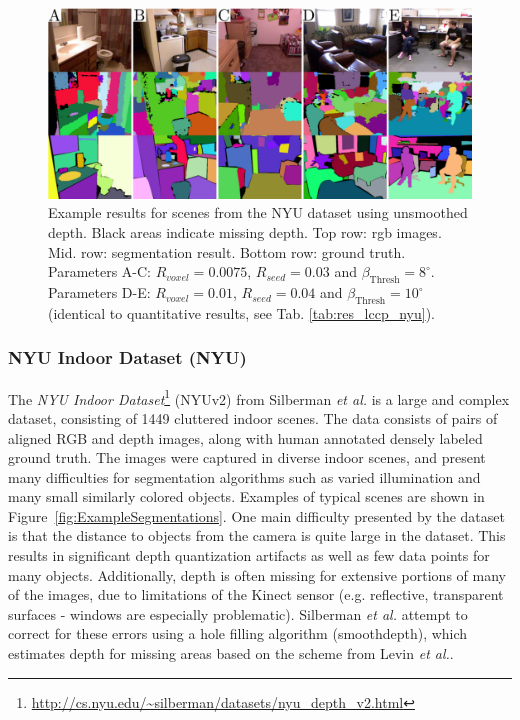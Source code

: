 \begin{figure}
 \centering
 \includegraphics[width=1\linewidth]{figures/CVPR2014/nyu_examples.pdf}
 \caption[NYU Dataset Examples]{Example results for scenes from the NYU dataset using unsmoothed depth. Black areas indicate missing depth. Top row: rgb images. Mid. row: segmentation result. Bottom row: ground truth. Parameters A-C: $R_{voxel}=0.0075$, $R_{seed}=0.03$ and $\beta_\text{Thresh}=8^\circ$. Parameters D-E: $R_{voxel}=0.01$, $R_{seed}=0.04$ and $\beta_\text{Thresh}=10^\circ$ (identical to quantitative results, see Tab. \ref{tab:res_lccp_nyu}).}
 \label{fig:nyu_examples}
\end{figure}

\subsubsection{NYU Indoor Dataset (NYU)}
The \textit{NYU Indoor Dataset}\footnote{\url{http://cs.nyu.edu/~silberman/datasets/nyu_depth_v2.html}} (NYUv2) from Silberman \textit{et al.}\cite{Silberman:ECCV12} is a large and complex dataset, consisting of 1449 cluttered indoor scenes. The data consists of pairs of aligned RGB and depth images, along with human annotated densely labeled ground truth. The images were captured in diverse indoor scenes, and present many difficulties for segmentation algorithms such as varied illumination and many small similarly colored objects. Examples of typical scenes are shown in Figure~\ref{fig:ExampleSegmentations}. One main difficulty presented by the dataset is that the distance to objects from the camera is quite large in the dataset. This results in significant depth quantization artifacts as well as few data points for many objects. Additionally, depth is often missing for extensive portions of many of the images, due to limitations of the Kinect sensor (e.g. reflective, transparent surfaces - windows are especially problematic). Silberman \textit{et al.} attempt to correct for these errors using a hole filling algorithm (smoothdepth), which estimates depth for missing areas based on the scheme from Levin \textit{et al.}\cite{Levin2004}.

